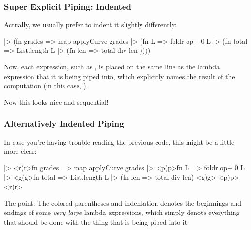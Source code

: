 \documentclass[aspectratio=169]{beamer}
\begin{document}


\begin{frame}[fragile]
  \frametitle{Super Explicit Piping: Indented}

  Actually, we usually prefer to indent it slightly differently:

  \begin{codeblock}
    [1, 2, 3]             |> (fn grades =>
    map applyCurve grades |> (fn L =>
    foldr op+ 0 L         |> (fn total =>
    List.length L         |> (fn len =>
    total div len         ))))
  \end{codeblock}

  \pause
  \vspace{\fill}

  Now, each expression, such as , is placed
  on the same line as the lambda expression that it is being piped into,
  which explicitly names the result of the computation (in this case, ).

  \pause
  \vspace{\fill}

  Now this looks nice and sequential!
\end{frame}

\begin{frame}[fragile]
  \frametitle{Alternatively Indented Piping}

  In case you're having trouble reading the previous code, this might be
  a little more clear:

  \begin{codeblock}[style=expandedHL]
    [1, 2, 3] |> <r(r>fn grades =>
      map applyCurve grades |> <p(p>fn L =>
        foldr op+ 0 L |> <g(g>fn total =>
          List.length L |> (fn len => total div len)
        <g)g>
      <p)p>
    <r)r>
  \end{codeblock}

  \pause
  \vspace{\fill}

  The point: The colored parentheses and indentation denotes the beginnings
  and endings of some \textit{very large} lambda expressions, which simply
  denote everything that should be done with the thing that is being piped
  into it.
\end{frame}
\end{document}
